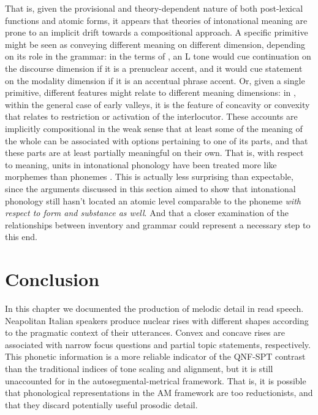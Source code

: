 That is, given the provisional and theory-dependent nature of both post-lexical functions and atomic forms, it appears that theories of intonational meaning are prone to an implicit drift towards a compositional approach. A specific primitive might be seen as conveying different meaning on different dimension, depending on its role in the grammar: in the terms of  \citet{petrone2008tonal,grice2005strategy}, an L tone would cue continuation on the discourse dimension if it is a prenuclear accent, and it would cue statement on the modality dimension if it is an accentual phrase accent. Or, given a single primitive, different features might relate to different meaning dimensions: in \citet{dombrowski2005acoustic}, within the general case of early valleys, it is the feature of concavity or convexity that relates to restriction or activation of the interlocutor. These accounts are implicitly compositional in the weak sense that at least some of the meaning of the whole can be associated with options pertaining to one of its parts, and that these parts are at least partially meaningful on their own. That is, with respect to meaning, units in intonational phonology have been treated more like morphemes than phonemes \citep{gussenhoven1984grammar}. This is actually less surprising than expectable, since the arguments discussed in this section aimed to show that intonational phonology still hasn't located an atomic level comparable to the phoneme \textit{with respect to form and substance as well}. And that a closer examination of the relationships between inventory and grammar could represent a necessary step to this end.

\section{Conclusion}\label{sec25}
In this chapter we documented the production of melodic detail in read speech. Neapolitan Italian speakers produce nuclear rises with different shapes according to the pragmatic context of their utterances. Convex and concave rises are associated with narrow focus questions and partial topic statements, respectively. This phonetic information is a more reliable indicator of the QNF-SPT contrast than the traditional indices of tone scaling and alignment, but it is still unaccounted for in the autosegmental-metrical framework. That is, it is possible that phonological representations in the AM framework are too reductionists, and that they discard potentially useful prosodic detail. 


